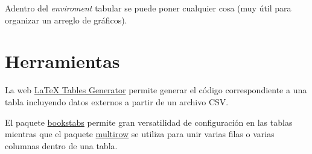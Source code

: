 \documentclass[11pt, a4paper]{article}
\begin{document}
Adentro del \textit{enviroment} tabular se puede poner cualquier cosa (muy útil para organizar un arreglo de gráficos).

\section{Herramientas}
La web \href{https://www.tablesgenerator.com}{LaTeX Tables Generator} permite generar el código correspondiente a una tabla incluyendo datos externos a partir de un archivo CSV.

El paquete \href{https://ctan.org/tex-archive/macros/latex/contrib/booktabs/}{bookstabs} permite gran versatilidad de configuración en las tablas mientras que 
el paquete \href{https://ctan.org/pkg/multirow?lang=en}{multirow} se utiliza para unir varias filas o varias columnas dentro de una tabla.
\end{document}
